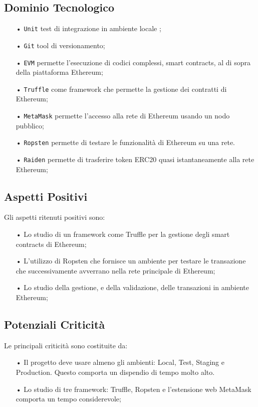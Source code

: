 \subsection{Dominio Tecnologico}
\begin{itemize}

\item[•] \texttt{Unit} test di integrazione in ambiente locale ;
\item[•] \texttt{Git} tool di versionamento;
\item[•] \texttt{EVM} permette l’esecuzione di codici complessi, smart contracts, al di sopra della piattaforma Ethereum;
\item[•] \texttt{Truffle} come framework che permette la gestione dei contratti di Ethereum;
\item[•] \texttt{MetaMask} 
permette l'accesso alla rete di Ethereum usando un nodo pubblico; 
\item[•] \texttt{Ropsten} permette di testare le funzionalità di Ethereum su una rete. 
\item[•] \texttt{Raiden} permette di trasferire token ERC20 quasi istantaneamente alla rete Ethereum;  

\end{itemize}

\subsection{Aspetti Positivi}

Gli aspetti ritenuti positivi sono: 
\begin{itemize}

\item[•] Lo studio di un framework come Truffle per la gestione degli smart contracts di Ethereum;
\item[•] L'utilizzo di Ropsten che fornisce un ambiente per testare le transazione che successivamente avverrano nella rete principale di Ethereum;
\item[•] Lo studio della gestione, e della validazione, delle transazioni in ambiente Ethereum; 

\end{itemize}

\subsection{Potenziali Criticità}
Le principali criticità sono costituite da: 
\begin{itemize}

\item[•] Il progetto deve usare almeno gli ambienti: Local, Test, Staging e Production. Questo comporta un dispendio di tempo molto alto. 

\item[•] Lo studio di tre framework: Truffle, Ropsten e l'estensione web MetaMask comporta un tempo considerevole;

\end{itemize}


